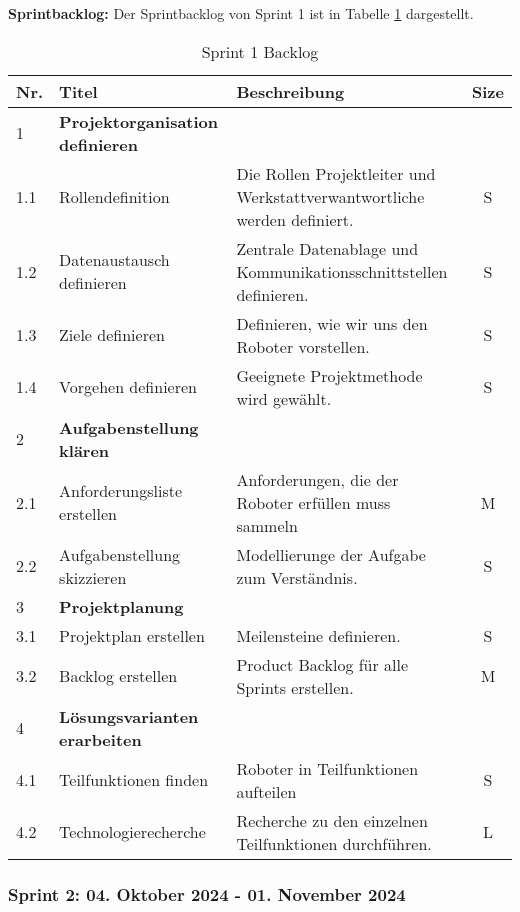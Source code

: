 \textbf{Sprintbacklog:} Der Sprintbacklog von Sprint 1 ist in Tabelle \ref{table:sprint1-backlog} dargestellt.

\begin{table}[H]
\centering
\small
\begin{tabularx}{\textwidth}{|l|l|X|c|}
\hline
  \textbf{Nr.} & \textbf{Titel} & \textbf{Beschreibung} & \textbf{Size}\\
  \hline
  1  & \textbf{Projektorganisation definieren} &&\\
  \hline
  1.1  & Rollendefinition & Die Rollen Projektleiter und Werkstattverwantwortliche werden definiert. & S\\
  \hline
  1.2 & Datenaustausch definieren & Zentrale Datenablage und Kommunikationsschnittstellen definieren.& S\\
  \hline
  1.3 & Ziele definieren & Definieren, wie wir uns den Roboter vorstellen. & S\\
  \hline
  1.4 & Vorgehen definieren & Geeignete Projektmethode wird gewählt. & S\\
  \hline
  2 & \textbf{Aufgabenstellung klären} && \\
  \hline
  2.1 & Anforderungsliste erstellen & Anforderungen, die der Roboter erfüllen muss sammeln& M \\
  \hline
  2.2 & Aufgabenstellung skizzieren & Modellierunge der Aufgabe zum Verständnis. & S \\
  \hline
  3 & \textbf{Projektplanung} && \\
  \hline
  3.1 & Projektplan erstellen & Meilensteine definieren. & S \\
  \hline
  3.2 & Backlog erstellen & Product Backlog für alle Sprints erstellen. & M \\
  \hline
  4 & \textbf{Lösungsvarianten erarbeiten} && \\
  \hline
  4.1 & Teilfunktionen finden & Roboter in Teilfunktionen aufteilen & S \\
  \hline
  4.2 & Technologierecherche & Recherche zu den einzelnen Teilfunktionen  durchführen. & L\\
  \hline
 
\end{tabularx}
\caption{Sprint 1 Backlog}
\label{table:sprint1-backlog}
\end{table}

\newpage
\subsubsection{Sprint 2: 04. Oktober 2024 - 01. November 2024}

